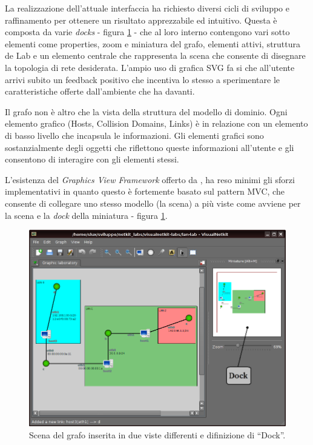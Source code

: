 La realizzazione dell'attuale interfaccia ha richiesto diversi cicli di sviluppo e raffinamento per ottenere un risultato apprezzabile ed intuitivo. Questa è composta da varie \emph{docks} - figura \ref{figura:vnetkit_graphics_view_1} - che al loro interno contengono vari sotto elementi come properties, zoom e miniatura del grafo, elementi attivi, struttura de Lab e un elemento centrale che rappresenta la scena che consente di disegnare la topologia di rete desiderata. L'ampio uso di grafica SVG fa si che all'utente arrivi subito un feedback positivo che incentiva lo stesso a sperimentare le caratteristiche offerte dall'ambiente che ha davanti.

Il grafo non è altro che la vista della struttura del modello di dominio. Ogni elemento grafico (Hosts, Collision Domains, Links) è in relazione con un elemento di basso livello che incapsula le informazioni. Gli elementi grafici sono sostanzialmente degli oggetti che riflettono queste informazioni all'utente e gli consentono di interagire con gli elementi stessi.

L'esistenza del \emph{Graphics View Framework} offerto da \qt{}, ha reso minimi gli sforzi implementativi in quanto questo è fortemente basato sul pattern MVC, che consente di collegare uno stesso modello (la scena) a più viste come avviene per la scena e la \textit{dock} della miniatura - figura \ref{figura:vnetkit_graphics_view_1}.

\begin{figure}[!htb]
	\centering
	\includegraphics[width=12cm]{images/visualnetkit_graphics_view_1.png}
	\caption{Scena del grafo inserita in due viste differenti e difinizione di ``Dock''.}
	\label{figura:vnetkit_graphics_view_1}
\end{figure}

